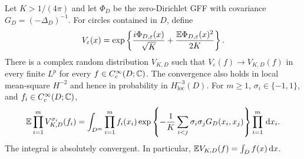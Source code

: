 \begin{lemma}\label{vi:circle-chaos}
Let $K>1/(4\pi)$ and let $\Phi_D$ be the zero-Dirichlet GFF with covariance
$G_D=(-\Delta_D)^{-1}$.  For circles contained in $D$, define
\[
 V_\varepsilon(x)=
 \exp\left\{\frac{i\Phi_{D,\varepsilon}(x)}{\sqrt K}
       +\frac{\mathbb E\Phi_{D,\varepsilon}(x)^2}{2K}\right\}.
\]
There is a complex random distribution $V_{K,D}$ such that
$V_\varepsilon(f)\longrightarrow V_{K,D}(f)$ in every finite $L^p$
for every $f\in C_c^\infty(D;\mathbb C)$.
The convergence also holds in local mean-square $H^{-2}$ and hence in
probability in $H^{-3}_{\mathrm{loc}}(D)$.
For $m\geq1$, $\sigma_i\in\{-1,1\}$, and $f_i\in C_c^\infty(D;\mathbb C)$,
\begin{equation}\label{vi:continuum-moments}
 \mathbb E\prod_{i=1}^m V_{K,D}^{\sigma_i}(f_i)
 =\int_{D^m}\prod_{i=1}^m f_i(x_i)
       \exp\left\{-\frac1K\sum_{i<j}\sigma_i\sigma_j
                       G_D(x_i,x_j)\right\}\prod_{i=1}^m\,\mathrm d x_i.
\end{equation}
The integral is absolutely convergent.  In particular,
$\mathbb E V_{K,D}(f)=\int_D f(x)\,\mathrm d x$.
\end{lemma}

